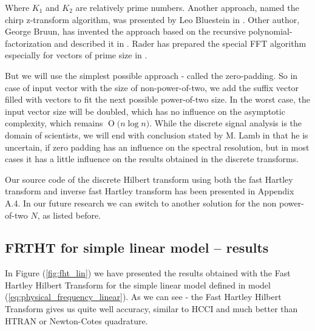 \documentclass[12pt,twoside,a4paper]{article}
\numberwithin{equation}{subsection}
\numberwithin{figure}{subsection}
\newcommand{\BigO}[1]{\ensuremath{\operatorname{O}\bigl(#1\bigr)}}
\begin{document}
Where $K_1$ and $K_2$ are relatively prime numbers. Another approach, named the chirp z-transform algorithm, was presented by Leo Bluestein in \cite{bluestein_linear}. Other author, George Bruun, has invented the approach based on the recursive polynomial-factorization and described it in \cite{bruun_ztransform}. Rader has prepared the special FFT algorithm especially for vectors of prime size in \cite{rader_dicrete}. 

But we will use the simplest possible approach - called the zero-padding. So in case of input vector with the size of non-power-of-two, we add the suffix vector filled with vectors to fit the next possible power-of-two size. In the worst case, the input vector size will be doubled, which has no influence on the asymptotic complexity, which remains $\BigO{n \log n}$. While the discrete signal analysis is the domain of scientists, we will end with conclusion stated by M. Lamb in \cite{lamb_issues} that he is uncertain, if zero padding has an influence on the spectral resolution, but in most cases it has a little influence on the results obtained in the discrete transforms.

Our source code of the discrete Hilbert transform using both the fast Hartley transform and inverse fast Hartley transform has been presented in Appendix A.4. In our future research we can switch to another solution for the non power-of-two $N$, as listed before.

\subsection{FRTHT for simple linear model -- results} \label{chap:hartley_lin}

In Figure (\ref{fig:fht_lin}) we have presented the results obtained with the Fast Hartley Hilbert Transform for the simple linear model defined in model (\ref{eq:physical_frequency_linear}). As we can see - the Fast Hartley Hilbert Transform gives us quite well accuracy, similar to HCCI and much better than HTRAN or Newton-Cotes quadrature.
\end{document}
